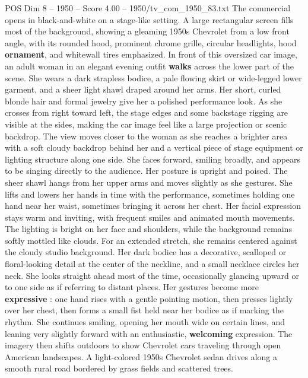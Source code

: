 \begin{textsample}{POS Dim 8 – 1950 – Score 4.00 – 1950/tv\_com\_1950\_83.txt}  \label{ex:f8_pos_077}
The commercial opens in black-and-white on a stage-like setting.
A large rectangular screen fills most of the background, showing a gleaming 1950s Chevrolet from a low front angle, with its rounded hood, prominent chrome grille, circular headlights, hood \textbf{ornament}, and whitewall tires emphasized.
In front of this oversized car image, an adult woman in an elegant evening outfit \textbf{walks} across the lower part of the scene.
She wears a dark strapless bodice, a pale flowing skirt or wide-legged lower garment, and a sheer light shawl draped around her arms.
Her short, curled blonde hair and formal jewelry give her a polished performance look.
As she crosses from right toward left, the stage edges and some backstage rigging are visible at the sides, making the car image feel like a large projection or scenic backdrop.
The view moves closer to the woman as she reaches a brighter area with a soft cloudy backdrop behind her and a vertical piece of stage equipment or lighting structure along one side.
She faces forward, smiling broadly, and appears to be singing directly to the audience.
Her posture is upright and poised.
The sheer shawl hangs from her upper arms and moves slightly as she gestures.
She lifts and lowers her hands in time with the performance, sometimes holding one hand near her waist, sometimes bringing it across her chest.
Her facial expression stays warm and inviting, with frequent smiles and animated mouth movements.
The lighting is bright on her face and shoulders, while the background remains softly mottled like clouds.
For an extended stretch, she remains centered against the cloudy studio background.
Her dark bodice has a decorative, scalloped or floral-looking detail at the center of the neckline, and a small necklace circles her neck.
She looks straight ahead most of the time, occasionally glancing upward or to one side as if referring to distant places.
Her gestures become more \textbf{expressive} : one hand rises with a gentle pointing motion, then presses lightly over her chest, then forms a small fist held near her bodice as if marking the rhythm.
She continues smiling, opening her mouth wide on certain lines, and leaning very slightly forward with an enthusiastic, \textbf{welcoming} expression.
The imagery then shifts outdoors to show Chevrolet cars traveling through open American landscapes.
A light-colored 1950s Chevrolet sedan drives along a smooth rural road bordered by grass fields and scattered trees.

\end{textsample}
